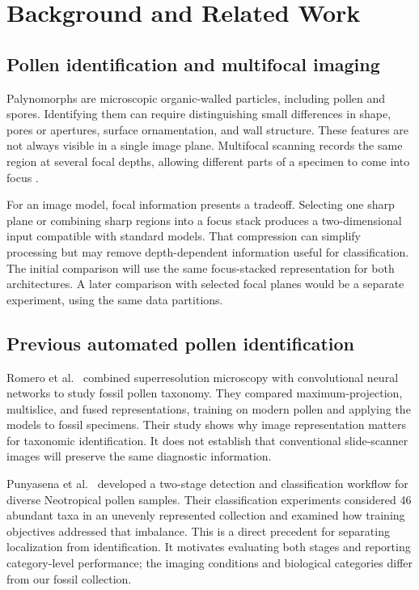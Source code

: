 \documentclass[11pt,letterpaper]{article}
\begin{document}
\section{Background and Related Work}
\subsection{Pollen identification and multifocal imaging}
Palynomorphs are microscopic organic-walled particles, including pollen and spores. Identifying them can require distinguishing small differences in shape, pores or apertures, surface ornamentation, and wall structure. These features are not always visible in a single image plane. Multifocal scanning records the same region at several focal depths, allowing different parts of a specimen to come into focus \citep{shaikh2026,punyasena2022}.

For an image model, focal information presents a tradeoff. Selecting one sharp plane or combining sharp regions into a focus stack produces a two-dimensional input compatible with standard models. That compression can simplify processing but may remove depth-dependent information useful for classification. The initial comparison will use the same focus-stacked representation for both architectures. A later comparison with selected focal planes would be a separate experiment, using the same data partitions.

\subsection{Previous automated pollen identification}
Romero et al.\ \citep{romero2020} combined superresolution microscopy with convolutional neural networks to study fossil pollen taxonomy. They compared maximum-projection, multislice, and fused representations, training on modern pollen and applying the models to fossil specimens. Their study shows why image representation matters for taxonomic identification. It does not establish that conventional slide-scanner images will preserve the same diagnostic information.

Punyasena et al.\ \citep{punyasena2022} developed a two-stage detection and classification workflow for diverse Neotropical pollen samples. Their classification experiments considered 46 abundant taxa in an unevenly represented collection and examined how training objectives addressed that imbalance. This is a direct precedent for separating localization from identification. It motivates evaluating both stages and reporting category-level performance; the imaging conditions and biological categories differ from our fossil collection.
\end{document}
